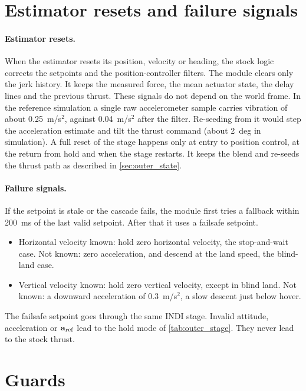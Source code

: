 \section{Estimator resets and failure signals}\label{sec:outer_resets}

\paragraph{Estimator resets.}
When the estimator resets its position, velocity or heading, the stock logic corrects the setpoints and the position-controller filters.
The module clears only the jerk history.
It keeps the measured force, the mean actuator state, the delay lines and the previous thrust.
These signals do not depend on the world frame.
In the reference simulation a single raw accelerometer sample carries vibration of about 0.25~m/s$^2$, against 0.04~m/s$^2$ after the filter.
Re-seeding from it would step the acceleration estimate and tilt the thrust command (about 2~deg in simulation).
A full reset of the stage happens only at entry to position control, at the return from hold and when the stage restarts.
It keeps the blend and re-seeds the thrust path as described in \cref{sec:outer_state}.

\paragraph{Failure signals.}
If the setpoint is stale or the cascade fails, the module first tries a fallback within 200~ms of the last valid setpoint.
After that it uses a failsafe setpoint.
\begin{itemize}
  \item Horizontal velocity known: hold zero horizontal velocity, the stop-and-wait case.
    Not known: zero acceleration, and descend at the land speed, the blind-land case.
  \item Vertical velocity known: hold zero vertical velocity, except in blind land.
    Not known: a downward acceleration of 0.3~m/s$^2$, a slow descent just below hover.
\end{itemize}
The failsafe setpoint goes through the same INDI stage.
Invalid attitude, acceleration or $\mathbf{a}_{\mathrm{ref}}$ lead to the hold mode of \cref{tab:outer_stage}.
They never lead to the stock thrust.

\section{Guards}\label{sec:outer_guards}

